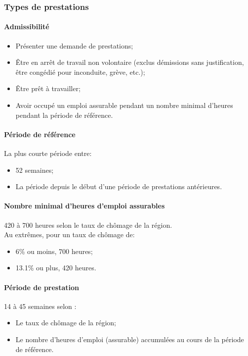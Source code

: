 \documentclass[10pt, french]{article}
\begin{document}
\begin{multicols*}{3}
\subsubsection*{Types de prestations}
\begin{definitionNOHFILL}
\paragraph{Admissibilité}
\begin{itemize}[leftmargin = *]
	\item	Présenter une demande de prestations;
	\item	Être en arrêt de travail non volontaire (exclus démissions sans justification, être congédié pour inconduite, grève, etc.);
	\item	Être prêt à travailler;
	\item	Avoir occupé un emploi assurable pendant un nombre minimal d'heures pendant la période de référence.
\end{itemize}

\paragraph{Période de référence}
La plus courte période entre:
\begin{itemize}[leftmargin = *]
	\item	52 semaines;
	\item	La période depuis le début d'une période de prestations antérieures.
\end{itemize}

\paragraph{Nombre minimal d'heures d'emploi assurables}
420 à 700 heures selon le taux de chômage de la région. \\
Au extrêmes, pour un taux de chômage de:
\begin{itemize}[leftmargin = *]
	\item	6\% ou moins, 700 heures;
	\item	13.1\% ou plus, 420 heures.
\end{itemize}

\paragraph{Période de prestation}
14 à 45 semaines selon :
\begin{itemize}[leftmargin = *]
	\item	Le taux de chômage de la région;
	\item	Le nombre d'heures d'emploi (assurable) accumulées au cours de la période de référence.
\end{itemize}
\end{definitionNOHFILL}


\end{multicols*}
\end{document}
